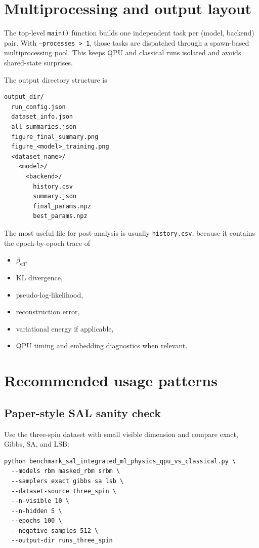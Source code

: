 \documentclass[11pt]{article}
\begin{document}
\section{Multiprocessing and output layout}

The top-level \texttt{main()} function builds one independent task per
(model, backend) pair. With \texttt{--processes > 1}, those tasks are dispatched
through a spawn-based multiprocessing pool. This keeps QPU and classical runs
isolated and avoids shared-state surprises.

The output directory structure is
\begin{lstlisting}[style=code]
output_dir/
  run_config.json
  dataset_info.json
  all_summaries.json
  figure_final_summary.png
  figure_<model>_training.png
  <dataset_name>/
    <model>/
      <backend>/
        history.csv
        summary.json
        final_params.npz
        best_params.npz
\end{lstlisting}

The most useful file for post-analysis is usually \texttt{history.csv}, because
it contains the epoch-by-epoch trace of
\begin{itemize}
  \item $\beta_{\mathrm{eff}}$,
  \item KL divergence,
  \item pseudo-log-likelihood,
  \item reconstruction error,
  \item variational energy if applicable,
  \item QPU timing and embedding diagnostics when relevant.
\end{itemize}

\section{Recommended usage patterns}

\subsection{Paper-style SAL sanity check}

Use the three-spin dataset with small visible dimension and compare exact,
Gibbs, SA, and LSB:

\begin{lstlisting}[style=code]
python benchmark_sal_integrated_ml_physics_qpu_vs_classical.py \
  --models rbm masked_rbm srbm \
  --samplers exact gibbs sa lsb \
  --dataset-source three_spin \
  --n-visible 10 \
  --n-hidden 5 \
  --epochs 100 \
  --negative-samples 512 \
  --output-dir runs_three_spin
\end{lstlisting}
\end{document}
